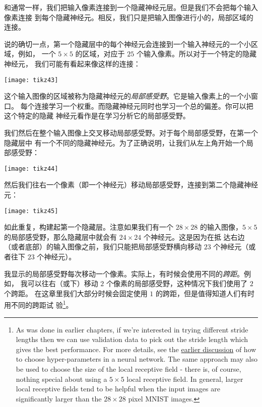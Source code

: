 和通常一样，我们把输入像素连接到一个隐藏神经元层。但是我们不会把每个输入像素连接
到每个隐藏神经元。相反，我们只是把输入图像进行小的，局部区域的连接。

说的确切一点，第一个隐藏层中的每个神经元会连接到一个输入神经元的一个小区域，例如，
一个 $5 \times 5$ 的区域，对应于 $25$ 个输入像素。所以对于一个特定的隐藏神经元，
我们可能有看起来像这样的连接：
\begin{center}
  \texttt{[image: tikz43]}
\end{center}

这个输入图像的区域被称为隐藏神经元的\emph{局部感受野}。它是输入像素上的一个小窗口。
每个连接学习一个权重。而隐藏神经元同时也学习一个总的偏差。你可以把这个特定的隐藏
神经元看作是在学习分析它的局部感受野。

我们然后在整个输入图像上交叉移动局部感受野。对于每个局部感受野，在第一个隐藏层中
有一个不同的隐藏神经元。为了正确说明，让我们从左上角开始一个局部感受野：
\begin{center}
  \texttt{[image: tikz44]}
\end{center}

然后我们往右一个像素（即一个神经元）移动局部感受野，连接到第二个隐藏神经元：
\begin{center}
  \texttt{[image: tikz45]}
\end{center}

如此重复，构建起第一个隐藏层。注意如果我们有一个 $28 \times 28$ 的输入图像，$5
\times 5$ 的局部感受野，那么隐藏层中就会有 $24 \times 24$ 个神经元。这是因为在抵
达右边（或者底部）的输入图像之前，我们只能把局部感受野横向移动 $23$ 个神经元（或
  者往下 $23$ 个神经元）。

我显示的局部感受野每次移动一个像素。实际上，有时候会使用不同的\emph{跨距}。例如，
我可以往右（或下）移动 $2$ 个像素的局部感受野，这种情况下我们使用了 $2$ 个跨距。
在这章里我们大部分时候会固定使用 $1$ 的跨距，但是值得知道人们有时用不同的跨距试
验\footnote{As was done in earlier chapters, if we're interested in trying
  different stride lengths then we can use validation data to pick out the
  stride length which gives the best performance. For more details, see the
  \hyperref[sec:how_to_choose_a_neural_network's_hyper-parameters]{earlier
    discussion} of how to choose hyper-parameters in a neural network. The same
  approach may also be used to choose the size of the local receptive field -
  there is, of course, nothing special about using a $5 \times 5$ local
  receptive field. In general, larger local receptive fields tend to be helpful
  when the input images are significantly larger than the $28 \times 28$ pixel
  MNIST images.}。\\

